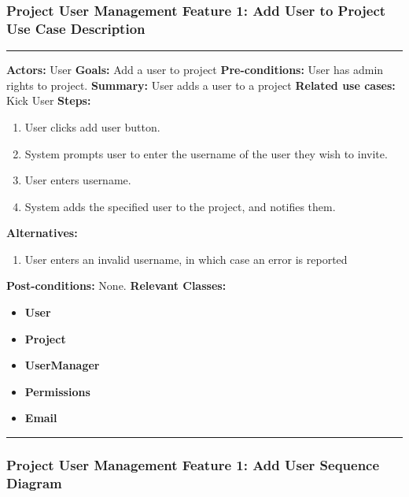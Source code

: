\documentclass[twoside,letterpaper]{article}
\begin{document}
\subsubsection[Project User Management Feature 1: Add User to Project Use Case Description]{\rmfamily\bfseries\color{black}
	Project User Management Feature 1: Add User to Project Use Case Description}
\hypertarget{RefHeading22059017292}{}

\vspace{2pt}
\hrule
\vspace{8pt}
 \textbf{Actors:} User \newline
\textbf{Goals:} Add a user to project \newline
 \textbf{Pre-conditions:} User has admin rights to project. \newline
 \textbf{Summary:} User adds a user to a project \newline
\textbf{Related use cases:} Kick User \newline
\textbf{Steps:} \begin{enumerate}
  \item User clicks add user button.
  \item System prompts user to enter the username of the user they wish to invite.
  \item User enters username.
  \item System adds the specified user to the project, and notifies them.
 \end{enumerate}
 \textbf{Alternatives:} \begin{enumerate}
  \item User enters an invalid username, in which case an error is reported
 \end{enumerate}
 \textbf{Post-conditions:} None. \newline
\vspace{8pt}
\textbf{Relevant Classes:}
\begin{itemize}
	\item \textbf{User}
	\item \textbf{Project}
	\item \textbf{UserManager}
	\item \textbf{Permissions}
	\item \textbf{Email}
\end{itemize}
\hrule
\newpage

\subsubsection[Project User Management Feature 1: Add User Sequence Diagram]{\rmfamily\bfseries\color{black}
	Project User Management Feature 1: Add User Sequence Diagram}
\hypertarget{RefHeading22059017292}{}
\end{document}
